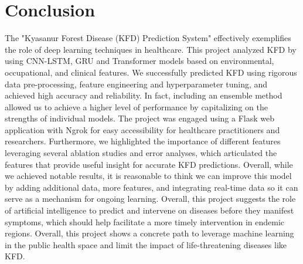 \documentclass[conference]{IEEEtran}
\begin{document}
\section*{Conclusion}
The "Kyasanur Forest Disease (KFD) Prediction System" effectively exemplifies the role of deep learning techniques in healthcare. This project analyzed KFD by using CNN-LSTM, GRU and Transformer models based on environmental, occupational, and clinical features. We successfully predicted KFD using rigorous data pre-processing, feature engineering and hyperparameter tuning, and achieved high accuracy and reliability. In fact, including an ensemble method allowed us to achieve a higher level of performance by capitalizing on the strengths of individual models. The project was engaged using a Flask web application with Ngrok for easy accessibility for healthcare practitioners and researchers. Furthermore, we highlighted the importance of different features leveraging several ablation studies and error analyses, which articulated the features that provide useful insight for accurate KFD predictions. Overall, while we achieved notable results, it is reasonable to think we can improve this model by adding additional data, more features, and integrating real-time data so it can serve as a mechanism for ongoing learning. Overall, this project suggests the role of artificial intelligence to predict and intervene on diseases before they manifest symptoms, which should help facilitate a more timely intervention in endemic regions. Overall, this project shows a concrete path to leverage machine learning in the public health space and limit the impact of life-threatening diseases like KFD.
\end{document}
